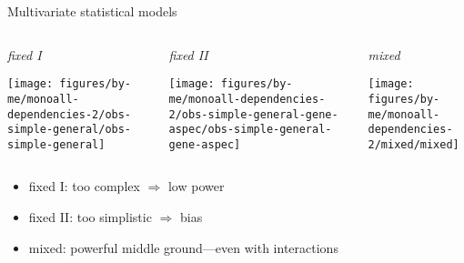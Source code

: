 \documentclass[usenames,dvipsnames]{beamer}
\begin{document}
\begin{frame}{Multivariate statistical models}
\begin{columns}[t]
\begin{column}{0.33\textwidth}
\emph{fixed I}

\texttt{[image: figures/by-me/monoall-dependencies-2/obs-simple-general/obs-simple-general]}
\end{column}

\begin{column}{0.33\textwidth}
\emph{fixed II}

\texttt{[image: figures/by-me/monoall-dependencies-2/obs-simple-general-gene-aspec/obs-simple-general-gene-aspec]}
\end{column}
\begin{column}{0.33\textwidth}
\emph{mixed}

\texttt{[image: figures/by-me/monoall-dependencies-2/mixed/mixed]}
\end{column}
\end{columns}
\vfill
\begin{itemize}
\item fixed I: too complex \(\Rightarrow\) low power
\item fixed II: too simplistic \(\Rightarrow\) bias
\item mixed: powerful middle ground---even with interactions
\end{itemize}
\end{frame}
\end{document}
